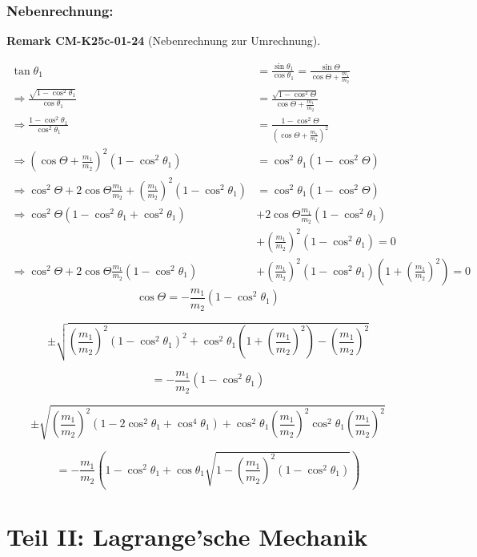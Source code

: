 \documentclass[10pt, letterpaper]{article}
\newcommand{\CustomHeading}[3]{%
  \par\medskip\noindent%
  \textbf{#1 #2} \textnormal{(#3)}.\enskip%
}
\newenvironment{REM}[2]{\begin{unitbox}\CustomHeading{Remark}{#1}{#2}}{\end{unitbox}}
\begin{document}
\subsubsection{Nebenrechnung:}

\begin{REM}{CM-K25c-01-24}{Nebenrechnung zur Umrechnung}
\begin{align*}
\tan\theta_1 &= \frac{\sin\theta_1}{\cos\theta_1} = \frac{\sin\Theta}{\cos\Theta + \frac{m_1}{m_2}} \\[2ex]
\Rightarrow \frac{\sqrt{1-\cos^2\theta_1}}{\cos\theta_1} &= \frac{\sqrt{1-\cos^2\Theta}}{\cos\Theta + \frac{m_1}{m_2}} \\[2ex]
\Rightarrow \frac{1-\cos^2\theta_1}{\cos^2\theta_1} &= \frac{1-\cos^2\Theta}{(\cos\Theta + \frac{m_1}{m_2})^2} \\[2ex]
\Rightarrow (\cos\Theta + \frac{m_1}{m_2})^2(1-\cos^2\theta_1) &= \cos^2\theta_1(1-\cos^2\Theta) \\[2ex]
\Rightarrow \cos^2\Theta + 2\cos\Theta\frac{m_1}{m_2} + (\frac{m_1}{m_2})^2(1-\cos^2\theta_1) &= \cos^2\theta_1(1-\cos^2\Theta) \\[2ex]
\Rightarrow \cos^2\Theta(1-\cos^2\theta_1 + \cos^2\theta_1) &+ 2\cos\Theta\frac{m_1}{m_2}(1-\cos^2\theta_1) \\
&+ (\frac{m_1}{m_2})^2(1-\cos^2\theta_1) = 0 \\[2ex]
\Rightarrow \cos^2\Theta + 2\cos\Theta\frac{m_1}{m_2}(1-\cos^2\theta_1) &+ (\frac{m_1}{m_2})^2(1-\cos^2\theta_1)(1+(\frac{m_1}{m_2})^2) = 0
\end{align*}
\[\cos\Theta = -\frac{m_1}{m_2}(1-\cos^2\theta_1)\]

\[\pm \sqrt{\left(\frac{m_1}{m_2}\right)^2(1-\cos^2\theta_1)^2 + \cos^2\theta_1\left(1+\left(\frac{m_1}{m_2}\right)^2\right)-\left(\frac{m_1}{m_2}\right)^2}\]

\[= -\frac{m_1}{m_2}(1-\cos^2\theta_1)\]

\[\pm \sqrt{\left(\frac{m_1}{m_2}\right)^2(1-2\cos^2\theta_1+\cos^4\theta_1) + \cos^2\theta_1\left(\frac{m_1}{m_2}\right)^2\cos^2\theta_1\left(\frac{m_1}{m_2}\right)^2}\]

\[= -\frac{m_1}{m_2}(1-\cos^2\theta_1 + \cos\theta_1\sqrt{1-\left(\frac{m_1}{m_2}\right)^2(1-\cos^2\theta_1)})\]
\end{REM}



\pagebreak



\section{Teil II: Lagrange'sche Mechanik}
\end{document}

